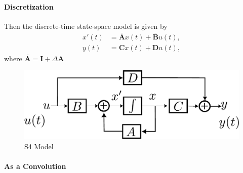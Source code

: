 \paragraph{Discretization} Then the discrete-time state-space model is given by
\begin{align*}
	x'(t) &= \overline{\mathbf{A}}x(t)+\overline{\mathbf{B}}u(t),\\
	y(t) &= \mathbf{C}x(t)+\mathbf{D}u(t),
\end{align*}
where $\overline{\mathbf{A}} = \mathbf{I}+\Delta \mathbf{A}$

\begin{figure}[h]
	\centering
	\includegraphics[scale=0.6]{./images/nlp/ssm.pdf}
	\caption{S4 Model}
	\label{fig:nlp_s4_model}
\end{figure}
\paragraph{As a Convolution} 

